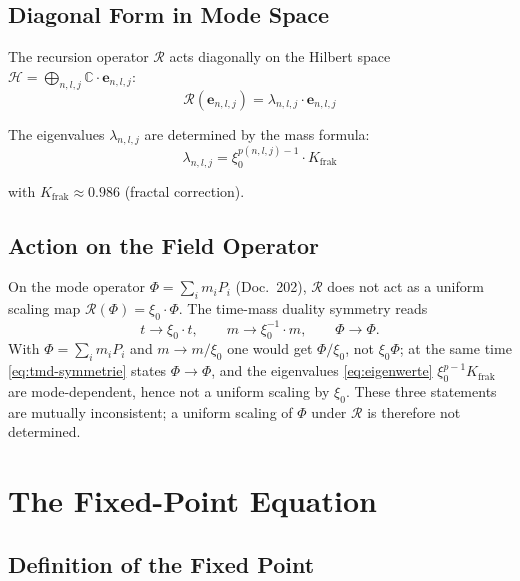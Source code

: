 \subsection{Diagonal Form in Mode Space}

The recursion operator $\mathcal{R}$ acts diagonally on the Hilbert space
$\mathcal{H} = \bigoplus_{n,l,j}\mathbb{C}\cdot\mathbf{e}_{n,l,j}$:
\begin{equation}
  \mathcal{R}(\mathbf{e}_{n,l,j})
  = \lambda_{n,l,j} \cdot \mathbf{e}_{n,l,j}
  \label{eq:R-diagonal}
\end{equation}

The eigenvalues $\lambda_{n,l,j}$ are determined by the mass formula:
\begin{equation}
  \lambda_{n,l,j} = \xi_0^{p(n,l,j)-1} \cdot K_{\text{frak}}
  \label{eq:eigenwerte}
\end{equation}

with $K_{\text{frak}} \approx 0.986$ (fractal correction).

\subsection{Action on the Field Operator}

On the mode operator $\Phi = \sum_i m_i P_i$ (Doc.~202),
$\mathcal{R}$ does not act as a uniform scaling map
$\mathcal{R}(\Phi) = \xi_0 \cdot \Phi$. The time-mass duality
symmetry reads
\begin{equation}
  t \to \xi_0 \cdot t, \qquad m \to \xi_0^{-1} \cdot m,
  \qquad \Phi \to \Phi .
  \label{eq:tmd-symmetrie}
\end{equation}
With $\Phi = \sum_i m_i P_i$ and $m \to m/\xi_0$ one would get
$\Phi/\xi_0$, not $\xi_0\Phi$; at the same time
\eqref{eq:tmd-symmetrie} states $\Phi \to \Phi$, and the eigenvalues
\eqref{eq:eigenwerte} $\xi_0^{p-1}K_{\text{frak}}$ are mode-dependent,
hence not a uniform scaling by $\xi_0$. These three statements are
mutually inconsistent; a uniform scaling of $\Phi$ under $\mathcal{R}$
is therefore not determined.

\section{The Fixed-Point Equation}

\subsection{Definition of the Fixed Point}

